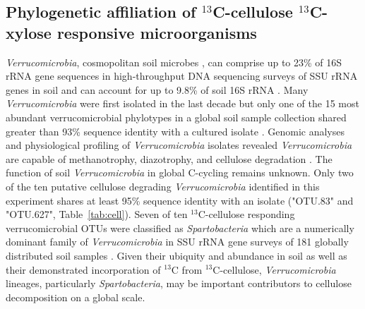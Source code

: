 \subsection{Phylogenetic affiliation of $^{13}$C-cellulose
    $^{13}$C-xylose responsive microorganisms}
\textit{Verrucomicrobia}, cosmopolitan soil microbes
\citep{Bergmann_2011}, can comprise up to 23\% of 16S rRNA gene sequences in
high-throughput DNA sequencing surveys of SSU rRNA genes in soil
\citep{Bergmann_2011} and can account for up to 9.8\% of
soil 16S rRNA \citep{Buckley_2001}. Many \textit{Verrucomicrobia} were first
isolated in the last decade \cite{Wertz_2011} but only one of the 15 most
abundant verrucomicrobial phylotypes in a global soil sample collection shared
greater than 93\% sequence identity with a cultured isolate
\citep{Bergmann_2011}. Genomic analyses and physiological profiling of
\textit{Verrucomicrobia} isolates revealed \textit{Verrucomicrobia} are capable
of methanotrophy, diazotrophy, and cellulose degradation \citep{Otsuka_2012,
Wertz_2011}. The function of soil \textit{Verrucomicrobia} in global C-cycling
remains unknown. Only two of the ten putative cellulose degrading
\textit{Verrucomicrobia} identified in this experiment shares at least 95\%
sequence identity with an isolate ("OTU.83" and "OTU.627",
Table~\ref{tab:cell}). Seven of ten $^{13}$C-cellulose responding
verrucomicrobial OTUs were classified as \textit{Spartobacteria} which are
a numerically dominant family of \textit{Verrucomicrobia} in SSU rRNA gene
surveys of 181 globally distributed soil samples \citep{Bergmann_2011}. Given
their ubiquity and abundance in soil as well as their demonstrated
incorporation of $^{13}$C from $^{13}$C-cellulose, \textit{Verrucomicrobia}
lineages, particularly \textit{Spartobacteria}, may be important contributors
to cellulose decomposition on a global scale.

